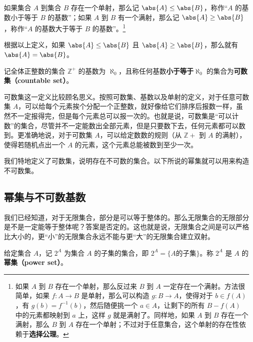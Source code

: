 \begin{definition}{}
如果集合 $A$ 到集合 $B$ 存在一个单射，那么记 $\abs{A}\leq\abs{B}$，称作“$A$ 的基数小于等于 $B$ 的基数”；如果 $A$ 到 $B$ 有一个满射，那么记 $\abs{A}\geq\abs{B}$，称作“$A$ 的基数大于等于 $B$ 的基数”。\footnote{如果 $A$ 到 $B$ 存在一个单射，那么反过来 $B$ 到 $A$ 一定存在一个满射。方法很简单，如果 $f:A\rightarrow B$ 是单射，那么可以构造 $g:B\rightarrow A$，使得对于 $b\in f(A)$，有 $g(b)=f^{-1}(b)$，然后随便挑一个 $a\in A$，让剩下的所有 $B-f(A)$ 中的元素都映射到 $a$ 上，这样 $g$ 就是满射了。同样地，如果 $A$ 到 $B$ 存在一个满射，那么 $B$ 到 $A$ 存在一个单射；不过对于任意集合，这个单射的存在性依赖于\textbf{选择公理}。}
\end{definition}

根据以上定义，如果 $\abs{A}\leq\abs{B}$ 且 $\abs{A}\geq\abs{B}$，那么就有 $\abs{A}=\abs{B}$。

\begin{definition}{}
记全体正整数的集合 $\mathbb{Z}^+$ 的基数为 $\aleph_0$，且称任何基数\textbf{小于等于}$\aleph_0$ 的集合为\textbf{可数集（countable set）}。
\end{definition}

可数集这一定义比较顾名思义。按照可数集、基数以及单射的定义，对于任意可数集 $A$，可以给每个元素挨个分配一个正整数，就好像给它们排序后报数一样，虽然不一定报得完，但是每个元素总可以报一次的。也就是说，可数集是“可以计数”的集合，尽管并不一定能数出全部元素，但是只要数下去，任何元素都可以数到。更准确地说，对于可数集 $A$，可以给定数数的规则（从 $\mathbb{Z}+$ 到 $A$ 的满射），使得若随机点出一个 $A$ 的元素，这个元素总能被数到至少一次。

我们特地定义了可数集，说明存在不可数的集合。以下所说的幂集就可以用来构造不可数集。





\subsection{幂集与不可数基数}

我们已经知道，对于无限集合，部分是可以等于整体的。那么无限集合的无限部分是不是一定能等于整体呢？答案是否定的。这也就是说，无限集合之间是可以严格比大小的，更“小”的无限集合永远不能与更“大”的无限集合建立双射。

\begin{definition}{}
给定集合 $A$，记 $2^A$ 为集合 $A$ 的子集的集合，即 $2^A=\{A\text{的子集}\}$。称 $2^A$ 是 $A$ 的\textbf{幂集（power set）}。
\end{definition}

